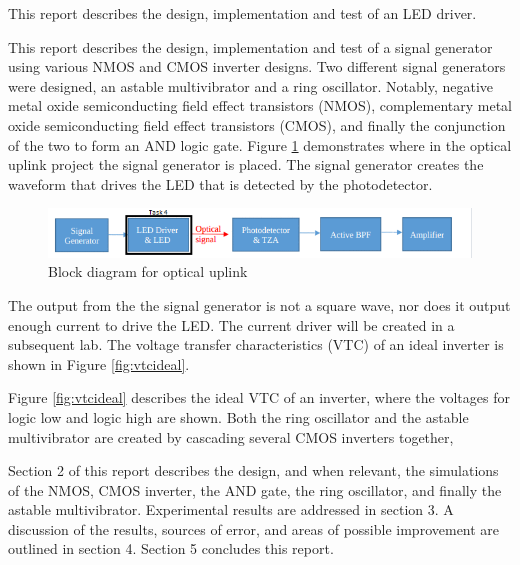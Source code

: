 




This report describes the design, implementation and test of an LED driver. 



\noindent This report describes the design, implementation and test of a signal generator using various NMOS and CMOS inverter designs. Two different signal generators were designed, an astable multivibrator and a ring oscillator. Notably,  negative metal oxide semiconducting field effect transistors (NMOS), complementary metal oxide semiconducting field effect transistors (CMOS), and finally the conjunction of the two to form an AND logic gate. Figure \ref{fig:blockdiagram2} demonstrates where in the optical uplink project the signal generator is placed. The signal generator creates the waveform that drives the LED that is detected by the photodetector. 



\begin{figure}[H]
    \centering
    \includegraphics[width=.9\textwidth ]{Introduction/Block_Diagram_MFBP.png}
    \caption{Block diagram for optical uplink \cite{b1}}
    \label{fig:blockdiagram2}
\end{figure}

The output from the the signal generator is not a square wave, nor does it output enough current to drive the LED. The current driver will be created in a subsequent lab. The voltage transfer characteristics (VTC) of an ideal inverter is shown in Figure \ref{fig:vtcideal}.




\noindent     Figure \ref{fig:vtcideal} describes the ideal VTC of an inverter, where the voltages for logic low and logic high are shown. Both the ring oscillator and the astable multivibrator are created by cascading several CMOS inverters together,

\noindent Section 2 of this report describes the design, and when relevant, the simulations of the NMOS, CMOS inverter, the AND gate, the ring oscillator, and finally the astable multivibrator. Experimental results are addressed in section 3. A discussion of the results, sources of error, and areas of possible improvement are outlined in section 4. Section 5 concludes this report. \newline




